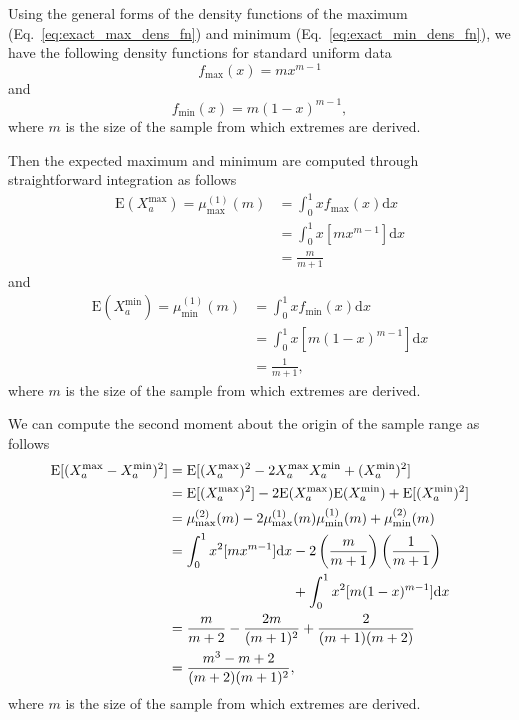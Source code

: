 \documentclass[10pt,letterpaper]{article}
\begin{document}
Using the general forms of the density functions of the maximum (Eq.~\ref{eq:exact_max_dens_fn}) and minimum (Eq.~\ref{eq:exact_min_dens_fn}), we have the following density functions for standard uniform data
%
\begin{equation}\label{eq:uniform_max_dens}
f_\text{max}(x) = m x^{m-1}
\end{equation}
%
and
%
\begin{equation}\label{eq:uniform_min_dens}
f_\text{min}(x) = m(1 - x)^{m-1},
\end{equation}
%
where $m$ is the size of the sample from which extremes are derived.

Then the expected maximum and minimum are computed through straightforward integration as follows
%
\begin{equation}\label{eq:mu_max_uniform}
\begin{aligned}
\text{E}(X^\text{max}_a) = \mu^{(1)}_\text{max}(m) &= \int_{0}^{1} x f_\text{max}(x) \text{d}x \\
&= \int_{0}^{1} x [m x^{m-1}] \text{d}x \\
&= \frac{m}{m+1}
\end{aligned}
\end{equation}
%
and
%
\begin{equation}\label{eq:mu_min_uniform}
\begin{aligned}
\text{E}(X^\text{min}_a) = \mu^{(1)}_\text{min}(m) &= \int_{0}^{1} x f_\text{min}(x) \text{d}x \\
&= \int_{0}^{1} x [m (1 - x)^{m-1}] \text{d}x \\
&= \frac{1}{m+1},
\end{aligned}
\end{equation}
%
where $m$ is the size of the sample from which extremes are derived.

We can compute the second moment about the origin of the sample range as follows
%
\begin{equation}\label{eq:mu2_rng_uniform}
\begin{aligned}
\text{E}[(X^\text{max}_a - X^\text{min}_a)^2] &= \text{E}[(X^\text{max}_a)^2 - 2 X^\text{max}_a X^\text{min}_a + (X^\text{min}_a)^2] \\
&= \text{E}[(X^\text{max}_a)^2] - 2 \text{E}(X^\text{max}_a) \text{E}(X^\text{min}_a) + \text{E}[(X^\text{min}_a)^2] \\
&= \mu^{(2)}_\text{max}(m) - 2 \mu^{(1)}_\text{max}(m) \mu^{(1)}_\text{min}(m) + \mu^{(2)}_\text{min}(m) \\
&= \int_{0}^{1} x^2 [m x^{m-1}] \text{d}x - 2 \left(\frac{m}{m+1}\right) \left(\frac{1}{m+1}\right) \\
& \hspace{3.12cm} + \int_{0}^{1} x^2 [m (1 - x)^{m-1}] \text{d}x \\
&= \frac{m}{m+2} - \frac{2m}{(m+1)^2} + \frac{2}{(m+1)(m+2)} \\
&= \frac{m^3 - m + 2}{(m+2)(m+1)^2},
\end{aligned}
\end{equation}
%
where $m$ is the size of the sample from which extremes are derived.
\end{document}
